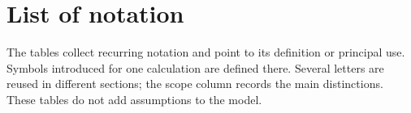 \chapter*{List of notation}
\label{S:notation}

The tables collect recurring notation and point to its definition or
principal use. Symbols introduced for one calculation are defined there.
Several letters are reused in different sections; the scope column records
the main distinctions. These tables do not add assumptions to the model.

\begingroup
\small
\setlength{\LTpre}{0pt}
\setlength{\LTpost}{12pt}


